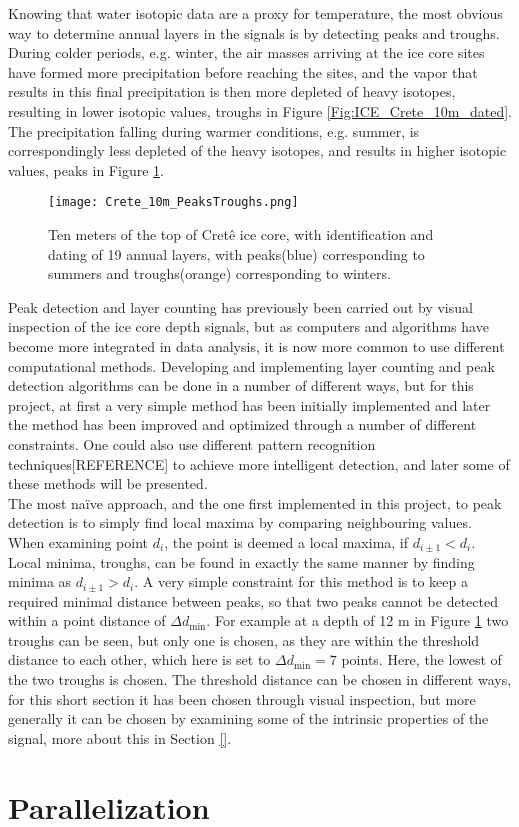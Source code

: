 \documentclass[../../CompleteThesis/Complete_1stDraft.tex]{subfiles}
\begin{document}
Knowing that water isotopic data are a proxy for temperature, the most obvious way to determine annual layers in the signals is by detecting peaks and troughs. During colder periods, e.g. winter, the air masses arriving at the ice core sites have formed more precipitation before reaching the sites, and the vapor that results in this final precipitation is then more depleted of heavy isotopes, resulting in lower isotopic values, troughs in Figure \ref{Fig:ICE_Crete_10m_dated}. The precipitation falling during warmer conditions, e.g. summer, is correspondingly less depleted of the heavy isotopes, and results in higher isotopic values, peaks in Figure \ref{Fig:COMPMETH_Crete_10m_PeaksTroughs}.
\begin{figure}[h]
	\centering
	\texttt{[image: Crete\_10m\_PeaksTroughs.png]}
	\caption{Ten meters of the top of Cretê ice core, with identification and dating of 19 annual layers, with peaks(blue) corresponding to summers and troughs(orange) corresponding to winters.}
	\label{Fig:COMPMETH_Crete_10m_PeaksTroughs}
\end{figure}
Peak detection and layer counting has previously been carried out by visual inspection of the ice core depth signals, but as computers and algorithms have become more integrated in data analysis, it is now more common to use different computational methods. Developing and implementing layer counting and peak detection algorithms can be done in a number of different ways, but for this project, at first a very simple method has been initially implemented and later the method has been improved and optimized through a number of different constraints. One could also use different pattern recognition techniques[REFERENCE] to achieve more intelligent detection, and later some of these methods will be presented.\\
The most naïve approach, and the one first implemented in this project, to peak detection is to simply find local maxima by comparing neighbouring values. When examining point $d_i$, the point is deemed a local maxima, if $d_{i\pm1} < d_i$. Local minima, troughs, can be found in exactly the same manner by finding minima as $d_{i\pm1} > d_i$. A very simple constraint for this method is to keep a required minimal distance between peaks, so that two peaks cannot be detected within a point distance of $\Delta d_{\text{min}}$. For example at a depth of 12 m in Figure \ref{Fig:COMPMETH_Crete_10m_PeaksTroughs} two troughs can be seen, but only one is chosen, as they are within the threshold distance to each other, which here is set to $\Delta d_{\text{min}} = 7$ points. Here, the lowest of the two troughs is chosen. The threshold distance can be chosen in different ways, for this short section it has been chosen through visual inspection, but more generally it can be chosen by examining some of the intrinsic properties of the signal, more about this in Section \ref{}.



\section[Parallelization]{Parallelization}	
\label{Sec:CompMeths_Parallelization}
\end{document}
